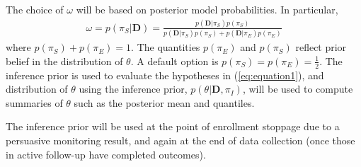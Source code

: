 \documentclass[12pt]{article}
\begin{document}
The choice of $\omega$ will be based on posterior model probabilities. In particular,
\begin{align}
\omega=p(\pi_S|\mathbf{D})=\frac{p(\mathbf{D}|\pi_S)p(\pi_S)}{p(\mathbf{D}|\pi_S)p(\pi_S)+p(\mathbf{D}|\pi_E)p(\pi_E)}
\end{align}
where $p(\pi_S)+p(\pi_E)=1$. The quantities $p(\pi_E)$ and $p(\pi_S)$ reflect prior belief in the distribution of $\theta$. A default option is $p(\pi_S)=p(\pi_E)=\frac{1}{2}$. The inference prior is used to evaluate the hypotheses in (\ref{eq:equation1}), and distribution of $\theta$ using the inference prior, $p(\theta|\mathbf{D},\pi_I)$, will be used to compute summaries of $\theta$ such as the posterior mean and quantiles.

The inference prior will be used at the point of enrollment stoppage due to a persuasive monitoring result, and again at the end of data collection (once those in active follow-up have completed outcomes).
\end{document}
